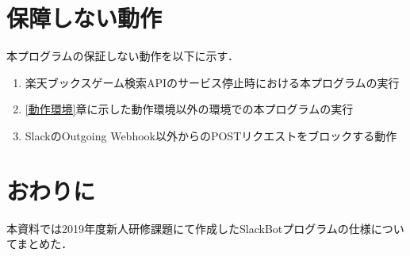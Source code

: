 \documentclass[12pt]{jsarticle}
\begin{document}
\section{保障しない動作}
本プログラムの保証しない動作を以下に示す．
\begin{enumerate}
  \item 楽天ブックスゲーム検索APIのサービス停止時における本プログラムの実行
  \item \ref{動作環境}章に示した動作環境以外の環境での本プログラムの実行
  \item SlackのOutgoing Webhook以外からのPOSTリクエストをブロックする動作
\end{enumerate}


\section{おわりに}
本資料では2019年度新人研修課題にて作成したSlackBotプログラムの仕様についてまとめた．



\end{document}
